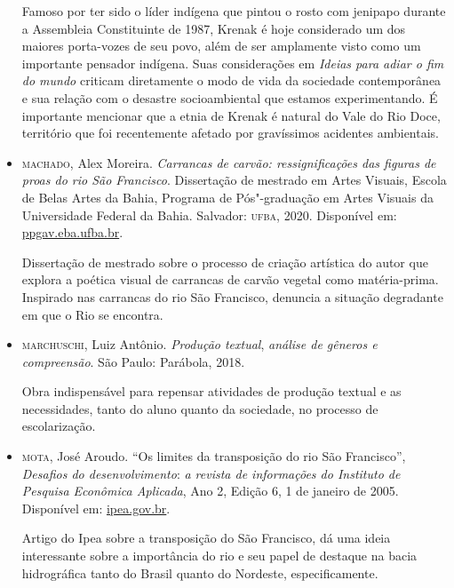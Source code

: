 \documentclass[12pt]{extarticle}
\begin{document}
\begin{itemize}
    Famoso por ter sido o líder indígena que pintou o rosto com jenipapo
    durante a Assembleia Constituinte de 1987, Krenak é hoje considerado
    um dos maiores porta-vozes de seu povo, além de ser amplamente visto
    como um importante pensador indígena. Suas considerações em
    \emph{Ideias para adiar o fim do mundo} criticam diretamente o modo
    de vida da sociedade contemporânea e sua relação com o desastre
    socioambiental que estamos experimentando. É importante mencionar
    que a etnia de Krenak é natural do Vale do Rio Doce, território que
    foi recentemente afetado por gravíssimos acidentes ambientais.

\item \textsc{machado}, Alex Moreira. \emph{Carrancas de carvão: ressignificações das
    figuras de proas do rio São Francisco}. Dissertação de mestrado em
    Artes Visuais, Escola de Belas Artes da Bahia, Programa de
    Pós"-graduação em Artes Visuais da Universidade Federal da Bahia.
    Salvador: \textsc{ufba}, 2020. Disponível em:
    \href{http://www.ppgav.eba.ufba.br/sites/ppgav.eba.ufba.br/files/2020_-_alex_moreira_machado.pdf}{ppgav.eba.ufba.br}.

    Dissertação de mestrado sobre o processo de criação artística do
    autor que explora a poética visual de carrancas de carvão vegetal
    como matéria-prima. Inspirado nas carrancas do rio São Francisco,
    denuncia a situação degradante em que o Rio se encontra.

\item \textsc{marchuschi}, Luiz Antônio\textsc{.} \emph{Produção textual},
    \emph{análise de gêneros e compreensão}. São Paulo: Parábola, 2018.

    Obra indispensável para repensar atividades de produção textual e as
    necessidades, tanto do aluno quanto da sociedade, no processo de
    escolarização.

\item \textsc{mota}, José Aroudo. ``Os limites da transposição do rio São
     Francisco'', \emph{Desafios do desenvolvimento}: \emph{a revista de
     informações do Instituto de Pesquisa Econômica Aplicada}, Ano 2,
     Edição 6, 1 de janeiro de 2005. Disponível em:
     \href{https://www.ipea.gov.br/desafios/index.php?option=com\_content\&view=article\&id=723:os-limites-da-transposicao-do-rio-sao-francisco\&catid=29:artigos-materias\&Itemid=34}{ipea.gov.br}.

     Artigo do Ipea sobre a transposição do São Francisco, dá uma ideia
     interessante sobre a importância do rio e seu papel de destaque na
     bacia hidrográfica tanto do Brasil quanto do Nordeste,
     especificamente.


\end{itemize}
\end{document}
